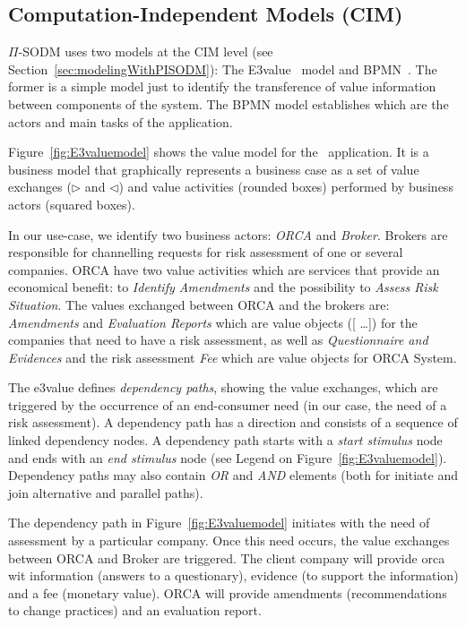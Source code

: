\subsection{Computation-Independent Models (CIM)}

$\Pi$-SODM uses two models at the CIM level (see Section~\ref{sec:modelingWithPISODM}): The E3value~\cite{e3value} model and BPMN~\cite{BPMN}.
The former is a simple model just to identify the transference of value information between components of the system.
The BPMN model establishes which are the actors and main tasks of the application.

Figure~\ref{fig:E3valuemodel} shows the value model for the \FlyingPig\ application.
It is a business model that graphically represents a business case as a set of value exchanges ($\triangleright$ and $\triangleleft$) and value activities (rounded boxes) performed by business actors (squared boxes).

In our use-case, we identify two business actors: \textsl{ORCA} and \textsl{Broker}. 
Brokers are responsible for channelling requests for risk assessment of one or several companies. 
ORCA have two value activities which are services that provide an economical benefit: to \textsl{Identify Amendments} and the possibility to \textsl{Assess Risk Situation}. 
The values exchanged between ORCA and the brokers are: \textsl{Amendments} and \textsl{Evaluation Reports} which are value objects ([ \!\dots]) for the companies that need to have a risk assessment, as well as  \textsl{Questionnaire and Evidences} and the risk assessment \textsl{Fee} which are value objects for ORCA System.

The e3value defines \textit{dependency paths}, showing the value exchanges, which are triggered by the occurrence of an end-consumer need (in our case, the need of a risk assessment). 
A dependency path has a direction and consists of a sequence of linked dependency nodes.
A dependency path starts with a \textit{start stimulus} node and ends with an \textit{end stimulus} node (see Legend on Figure~\ref{fig:E3valuemodel}). 
Dependency paths may also contain \textsl{OR} and \textsl{AND} elements (both for initiate and join alternative and parallel paths).

The dependency path in Figure~\ref{fig:E3valuemodel} initiates with the need of assessment by a particular company. 
Once this need occurs, the value exchanges between ORCA and Broker are triggered. 
The client company will provide orca wit information (answers to a questionary), evidence (to support the information) and a fee (monetary value).
ORCA will provide amendments (recommendations to change practices) and an evaluation report. 

